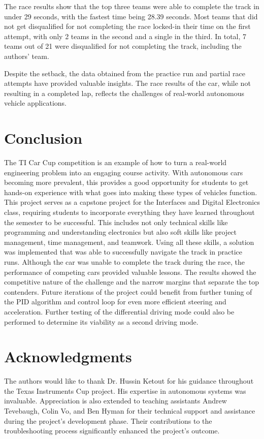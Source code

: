 \documentclass[conference]{IEEEtran}
\begin{document}
The race results show that the top three teams were able to complete the track in under 29 seconds, with the fastest time being 28.39 seconds. Most teams that did not get disqualified for not completing the race locked-in their time on the first attempt, with only 2 teams in the second and a single in the third. In total, 7 teams out of 21 were disqualified for not completing the track, including the authors' team.

Despite the setback, the data obtained from the practice run and partial race attempts have provided valuable insights. The race results of the car, while not resulting in a completed lap, reflects the challenges of real-world autonomous vehicle applications.

\section{Conclusion}

The TI Car Cup competition is an example of how to turn a real-world engineering problem into an engaging course activity. With autonomous cars becoming more prevalent, this provides a good opportunity for students to get hands-on experience with what goes into making these types of vehicles function. This project serves as a capstone project for the Interfaces and Digital Electronics class, requiring students to incorporate everything they have learned throughout the semester to be successful. This includes not only technical skills like programming and understanding electronics but also soft skills like project management, time management, and teamwork. Using all these skills, a solution was implemented that was able to successfully navigate the track in practice runs. Although the car was unable to complete the track during the race, the performance of competing cars provided valuable lessons. The results showed the competitive nature of the challenge and the narrow margins that separate the top contenders. Future iterations of the project could benefit from further tuning of the PID algorithm and control loop for even more efficient steering and acceleration. Further testing of the differential driving mode could also be performed to determine its viability as a second driving mode.

\section{Acknowledgments}

The authors would like to thank Dr. Hussin Ketout for his guidance throughout the Texas Instruments Cup project. His expertise in autonomous systems was invaluable. Appreciation is also extended to teaching assistants Andrew Tevebaugh, Colin Vo, and Ben Hyman for their technical support and assistance during the project's development phase. Their contributions to the troubleshooting process significantly enhanced the project's outcome.
\end{document}
